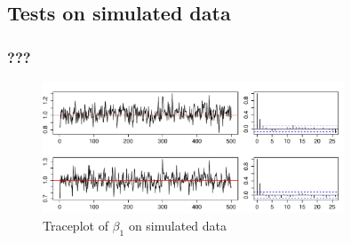 \documentclass[a4paper]{article}\usepackage[]{graphicx}\usepackage[]{color}
\begin{document}
\subsection{Tests on simulated data}

\subsubsection{???}

\begin{figure}[ht]
\centering
\includegraphics[width=0.8\textwidth]{fig/fig_traceplot_beta}
\caption{Traceplot of $\beta_1$ on simulated data }
\end{figure}
\end{document}
